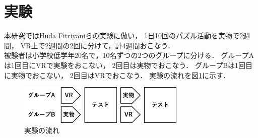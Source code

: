 \section{実験}
  本研究ではHuda Fitriyaniらの実験\cite{puzzle}に倣い，
  1日10回のパズル活動を実物で2週間，
  VR上で2週間の2回に分けて，計4週間おこなう．
  \\\indent
  被験者は小学校低学年20名で，10名ずつの2つのグループに分ける．
  グループAは1回目にVRで実験をおこない，
  2回目は実物でおこなう．
  グループBは1回目に実物でおこない，
  2回目はVRでおこなう．
  実験の流れを図\ref{flow}に示す．
  \begin{figure}[h]
    \begin{center}
      \includegraphics[width=80mm]{./images/experiment.png}
      \caption{実験の流れ}\label{flow}
    \end{center}
  \end{figure}
